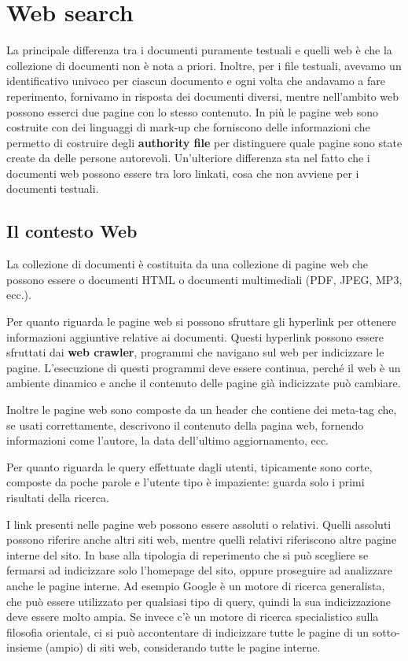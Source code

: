 
\chapter{Web search}

La principale differenza tra i documenti puramente testuali e quelli web è che la collezione di documenti non è nota a priori.
Inoltre, per i file testuali, avevamo un identificativo univoco per ciascun documento e ogni volta che andavamo a fare reperimento, fornivamo in risposta dei documenti diversi, mentre nell'ambito web possono esserci due pagine con lo stesso contenuto.
In più le pagine web sono costruite con dei linguaggi di mark-up che forniscono delle informazioni che permetto di costruire degli \textbf{authority file} per distinguere quale pagine sono state create da delle persone autorevoli.
Un'ulteriore differenza sta nel fatto che i documenti web possono essere tra loro linkati, cosa che non avviene per i documenti testuali.

\section{Il contesto Web}

La collezione di documenti è costituita da una collezione di pagine web che possono essere o documenti HTML o documenti multimediali (PDF, JPEG, MP3, ecc.).

Per quanto riguarda le pagine web si possono sfruttare gli hyperlink per ottenere informazioni aggiuntive relative ai documenti.
Questi hyperlink possono essere sfruttati dai \textbf{web crawler}, programmi che navigano sul web per indicizzare le pagine.
L'esecuzione di questi programmi deve essere continua, perché il web è un ambiente dinamico e anche il contenuto delle pagine già indicizzate può cambiare.

Inoltre le pagine web sono composte da un header che contiene dei meta-tag che, se usati correttamente, descrivono il contenuto della pagina web, fornendo informazioni come l'autore, la data dell'ultimo aggiornamento, ecc.

Per quanto riguarda le query effettuate dagli utenti, tipicamente sono corte, composte da poche parole e l'utente tipo è impaziente: guarda solo i primi risultati della ricerca.

I link presenti nelle pagine web possono essere assoluti o relativi. Quelli assoluti possono riferire anche altri siti web, mentre quelli relativi riferiscono altre pagine interne del sito.
In base alla tipologia di reperimento che si può scegliere se fermarsi ad indicizzare solo l'homepage del sito, oppure proseguire ad analizzare anche le pagine interne.
Ad esempio Google è un motore di ricerca generalista, che può essere utilizzato per qualsiasi tipo di query, quindi la sua indicizzazione deve essere molto ampia. Se invece c'è un motore di ricerca specialistico sulla filosofia orientale, ci si può accontentare di indicizzare tutte le pagine di un sotto-insieme (ampio) di siti web, considerando tutte le pagine interne.

